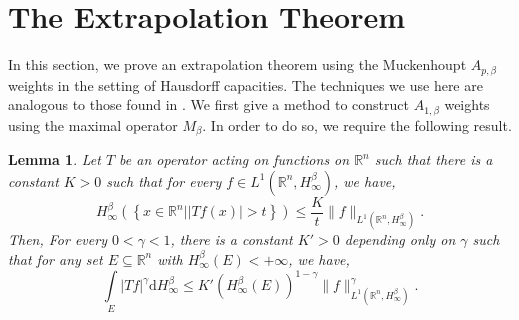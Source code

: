 \documentclass{amsart}
\newtheorem{lemma}[theorem]{Lemma}
\numberwithin{theorem}{section}
\numberwithin{equation}{section}
\begin{document}
	\section{The Extrapolation Theorem}
		\label{MainResultSection}
		In this section, we prove an extrapolation theorem using the Muckenhoupt $A_{p, \beta}$ weights in the setting of Hausdorff capacities. The techniques we use here are analogous to those found in \cite{DuoandikoetxeaBook}. 
		We first give a method to construct $A_{1, \beta}$ weights using the maximal operator $M_{\beta}$. In order to do so, we require the following result.
		\begin{lemma}
			\label{PreparatoryLemmaConstructionA1}
			Let $T$ be an operator acting on functions on $\mathbb{R}^n$ such that there is a constant $K > 0$ such that for every $f \in L^1 \left( \mathbb{R}^n, H_{\infty}^{\beta} \right)$, we have,
			\begin{equation}
				\label{Weak11T}
				H_{\infty}^{\beta} \left( \left\lbrace x \in \mathbb{R}^n | \left| Tf \left( x \right) \right| > t \right\rbrace \right) \leq \frac{K}{t} \| f \|_{L^1 \left( \mathbb{R}^n, H^{\beta}_{\infty} \right)}.
			\end{equation}
			Then, For every $0 < \gamma < 1$, there is a constant $K' > 0$ depending only on $\gamma$ such that for any set $E \subseteq \mathbb{R}^n$ with $H^{\beta}_{\infty} \left( E \right) < + \infty$, we have,
			\begin{equation}
				\label{PreparatoryEquation}
				\int\limits_{E} \left| Tf \right|^{\gamma} \mathrm{d}H^{\beta}_{\infty} \leq K' \left( H^{\beta}_{\infty} \left( E \right) \right)^{1 - \gamma} \| f \|_{L^1 \left( \mathbb{R}^n, H^{\beta}_{\infty} \right)}^{\gamma}.
			\end{equation}
		\end{lemma}
\end{document}
